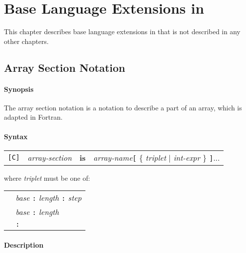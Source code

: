 \chapter{Base Language Extensions in {\XMPC}}


This chapter describes base language extensions in {\XMPC} that is not
described in any other chapters.

\section{Array Section Notation}

\subsubsection*{Synopsis}

The array section notation is a notation to describe a part of an array, 
which is adapted in Fortran.

\subsubsection*{Syntax}

\begin{tabular}{llll}
\verb![C]! & {\it array-section} & {\bf is} & {\it array-name}{\tt [} \{
 {\it triplet} $\vert$ {\it int-expr} \} {\tt ]}...
\end{tabular}

\vspace{0.5cm}

where {\it triplet} must be one of:

\vspace{0.3cm}

\begin{tabular}{ll}
 \hspace{0.5cm} & {\it base} {\tt :} {\it length} {\tt :} {\it step} \\
 \hspace{0.5cm} & {\it base} {\tt :} {\it length}\\
 \hspace{0.5cm} & {\tt :} \\
\end{tabular}

\subsubsection*{Description}

